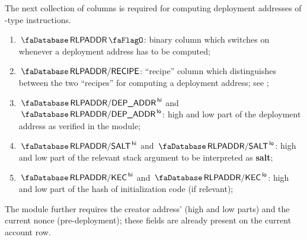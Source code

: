 The next collection of columns is required for computing deployment addresses of -type instructions.
\begin{enumerate}[resume]
	\item $\accRlpAddrFlag$:
		binary column which switches on whenever a deployment address has to be computed;
	\item $\accRlpAddrRecipe$:
		``recipe'' column which distinguishes between the two ``recipes'' for computing a deployment address; see ; 
	\item $\accRlpAddrDepAddrHi$ and $\accRlpAddrDepAddrLo$:
		high and low part of the deployment address as verified in the \rlpAddrMod{} module;
	\item $\accRlpAddrSaltHi$ and $\accRlpAddrSaltLo$:
		high and low part of the relevant stack argument to be interpreted as \textbf{salt}; 
	\item $\accRlpAddrKecHi$ and $\accRlpAddrKecLo$:
		high and low part of the hash of initialization code (if relevant);
\end{enumerate}
\saNote{} The \rlpAddrMod{} module further requires the creator address' (high and low parts) and the current nonce (pre-deployment); these fields are already present on the current account row.
